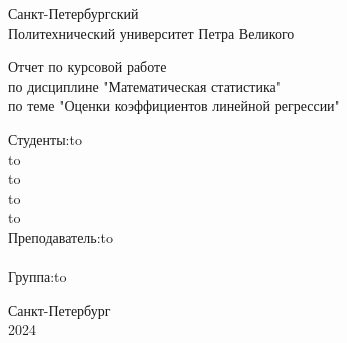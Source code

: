 \documentclass[12pt,a4paper]{article}
\begin{document}
\begin{titlepage}

\Large

\begin{center}
Санкт-Петербургский \\ Политехнический университет Петра Великого

\vspace{10em}

Отчет по курсовой работе\\
по дисциплине "Математическая статистика"\\
по теме "Оценки коэффициентов линейной регрессии"\\

\vspace{2em}

\end{center}

\vspace{6em}

\newbox{\lbox}
\newlength{\maxl}
\setlength{\maxl}{\wd\lbox}
\hfill\parbox{12cm}{
\hspace*{3cm}\hspace*{-5cm}Студенты:\hfill\hbox to\\
\hspace*{3cm}\hspace*{-5cm}\hfill\hbox to\\
\hspace*{3cm}\hspace*{-5cm}\hfill\hbox to\\
\hspace*{3cm}\hspace*{-5cm}\hfill\hbox to\\
\hspace*{3cm}\hspace*{-5cm}\hfill\hbox to\\
\hspace*{3cm}\hspace*{-5cm}Преподаватель:\hfill\hbox to\\
\\
\hspace*{3cm}\hspace*{-5cm}Группа:\hfill\hbox to\\
}

\vspace{\fill}

\begin{center}
Санкт-Петербург \\2024
\end{center}

\end{titlepage}
\end{document}
